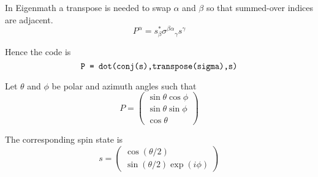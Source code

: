 \documentclass[12pt]{article}
\begin{document}
In Eigenmath a transpose is needed to swap $\alpha$ and $\beta$ so that summed-over indices are adjacent.
\begin{equation*}
P^\alpha=s_\beta^*\sigma^{\beta\alpha}{}_\gamma s^\gamma
\end{equation*}

Hence the code is
\begin{equation*}
\text{\tt P = dot(conj(s),transpose(sigma),s)}
\end{equation*}

Let $\theta$ and $\phi$ be polar and azimuth angles such that
\begin{equation*}
P=\begin{pmatrix}\sin\theta\cos\phi\\\sin\theta\sin\phi\\\cos\theta\end{pmatrix}
\end{equation*}

The corresponding spin state is
\begin{equation*}
s=\begin{pmatrix}\cos(\theta/2)\\\sin(\theta/2)\exp(i\phi)\end{pmatrix}
\end{equation*}
\end{document}
